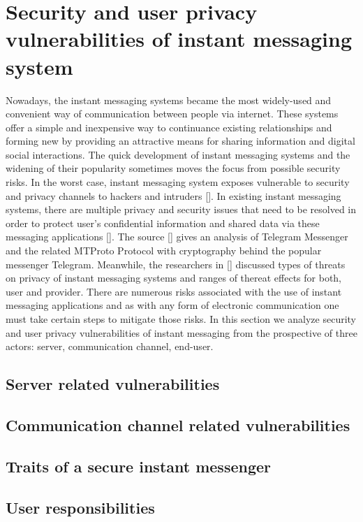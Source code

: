 \chapter{Security and user privacy vulnerabilities of instant messaging system}
\label{ch:security-and-user-privacy-vulnerabilities-of-instant-messaging-system}

Nowadays, the instant messaging systems became the most widely-used and convenient way of communication between
people via internet.
These systems offer a simple and inexpensive way to continuance existing relationships and forming new by providing an
attractive means for sharing information and digital social interactions.
The quick development of instant messaging systems and the widening of their popularity sometimes moves the
focus from possible security risks.
In the worst case, instant messaging system exposes vulnerable to security and privacy channels to hackers and intruders
[\cite{mcclure2009hacking, mannan2005secure}].
In existing instant messaging systems, there are multiple privacy and security issues that need to be resolved in order
to protect user's confidential information and shared data via these messaging applications [\cite{loesing2006privacy}].
The source [\cite{job2015modified}] gives an analysis of Telegram Messenger and the related MTProto Protocol with cryptography
behind the popular messenger Telegram.
Meanwhile, the researchers in [\cite{khan2015survey}] discussed types of threats on privacy of instant messaging systems
and ranges of thereat effects for both, user and provider.
There are numerous risks associated with the use of instant messaging applications and as with any form of
electronic communication one must take certain steps to mitigate those risks.
In this section we analyze security and user privacy vulnerabilities of instant messaging from the prospective of three
actors: server, communication channel, end-user.


\section{Server related vulnerabilities}\label{sec:server-vulnerabilities}



\section{Communication channel related vulnerabilities}\label{sec:communication-channel-vulnerabilities}



\section{Traits of a secure instant messenger}\label{sec:traits-of-a-secure-instant-messenger}



\section{User responsibilities}\label{sec:user-responsibilities}
